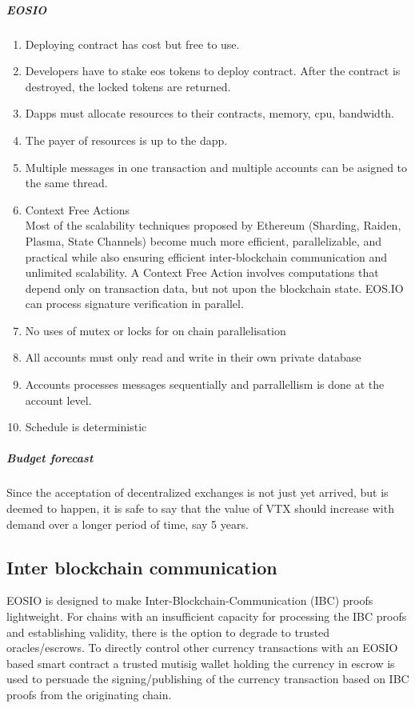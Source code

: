 \documentclass[]{article}
\begin{document}
\subparagraph{EOSIO}

\begin{enumerate}
\item Deploying contract has cost but free to use. 
\item Developers have to stake eos tokens to deploy contract.
After the contract is destroyed, the locked tokens are returned.
\item Dapps must allocate resources to their contracts, memory, cpu, bandwidth. 
\item The payer of resources is up to the dapp.
\item Multiple messages in one transaction and multiple accounts can be asigned to the same thread.
\item Context Free Actions \\
Most of the scalability techniques proposed by Ethereum (Sharding, Raiden, Plasma, State Channels) become much more efficient, parallelizable, and practical while also ensuring efficient inter-blockchain communication and unlimited scalability.
A Context Free Action involves computations that depend only on transaction data, but not upon the blockchain state. 
EOS.IO can process signature verification in parallel.

\item No uses of mutex or locks for on chain parallelisation
\item All accounts must only read and write in their own private database
\item Accounts processes messages sequentially and  parrallellism is done at the account level.
\item Schedule is deterministic
\end{enumerate}

\subparagraph{Budget forecast}
Since the acceptation of decentralized exchanges is not just yet arrived,
but is deemed to happen, it is safe to say that the value of VTX should increase with demand over a longer period of time, say 5 years.

\subsection{Inter blockchain communication}
EOSIO is designed to make Inter-Blockchain-Communication (IBC) proofs lightweight. 
For chains with an insufficient capacity for processing the  IBC proofs and establishing validity, 
there is the option to degrade to trusted oracles/escrows.
To directly control other currency transactions with an
EOSIO based smart contract a trusted mutisig wallet holding the currency 
in escrow is used to persuade the signing/publishing of the currency 
transaction based on IBC proofs from the originating chain.	
\end{document}
